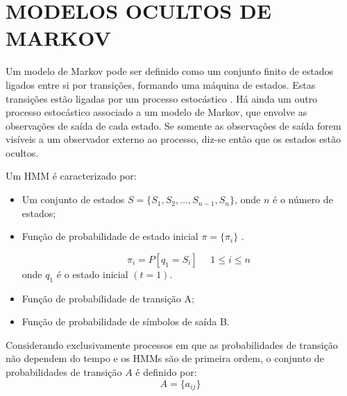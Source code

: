\chapter{MODELOS OCULTOS DE MARKOV}
\thispagestyle{plain}
\quad Um modelo de Markov pode ser definido como um conjunto finito de estados ligados entre si por transições, formando uma máquina de estados. Estas transições estão ligadas por um processo estocástico .  Há ainda um outro processo estocástico associado a um modelo de Markov, que envolve as observações de saída de cada estado. Se somente as observações de saída forem visíveis a um observador externo ao processo, diz-se então que os estados estão ocultos. %




Um HMM é caracterizado por:

\begin{itemize}

\item  Um conjunto de estados $ S =  \{S_1, S_2, \ldots, S_{n-1}, S_n\} $, onde $n$ é o número de estados;

\item Função de probabilidade de estado inicial $\pi = \{\pi_i\}$ .

\begin{equation}
\pi_i = P[q_1 = S_i ]~~\textrm{ }~ 1 \leq i \leq n 
\end{equation}
onde $q_1$ é o estado inicial $(t = 1)$.

\item Função de probabilidade de transição A;

\item Função de probabilidade de símbolos de saída B.

\end{itemize}

Considerando exclusivamente processos em que as probabilidades de transição não dependem do tempo e os HMMs são de primeira ordem, o conjunto de probabilidades de transição $A$ é definido por: 
 \begin{equation}
A = \{ a_{ij}\} 
\end{equation}

